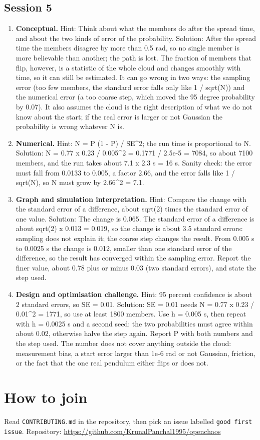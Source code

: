 \documentclass[11pt,a4paper]{article}
\begin{document}
\subsection*{Session 5}
\begin{enumerate}[nosep]
\item \textbf{Conceptual.} Hint: Think about what the members do after the spread time, and about the two kinds of error of the probability. Solution: After the spread time the members disagree by more than 0.5 rad, so no single member is more believable than another; the path is lost. The fraction of members that flip, however, is a statistic of the whole cloud and changes smoothly with time, so it can still be estimated. It can go wrong in two ways: the sampling error (too few members, the standard error falls only like 1 / sqrt(N)) and the numerical error (a too coarse step, which moved the 95 degree probability by 0.07). It also assumes the cloud is the right description of what we do not know about the start; if the real error is larger or not Gaussian the probability is wrong whatever N is.
\item \textbf{Numerical.} Hint: N = P (1 - P) / SE\textasciicircum{}2; the run time is proportional to N. Solution: N = 0.77 x 0.23 / 0.005\textasciicircum{}2 = 0.1771 / 2.5e-5 = 7084, so about 7100 members, and the run takes about 7.1 x 2.3 s = 16 s. Sanity check: the error must fall from 0.0133 to 0.005, a factor 2.66, and the error falls like 1 / sqrt(N), so N must grow by 2.66\textasciicircum{}2 = 7.1.
\item \textbf{Graph and simulation interpretation.} Hint: Compare the change with the standard error of a difference, about sqrt(2) times the standard error of one value. Solution: The change is 0.065. The standard error of a difference is about sqrt(2) x 0.013 = 0.019, so the change is about 3.5 standard errors: sampling does not explain it; the coarse step changes the result. From 0.005 s to 0.0025 s the change is 0.012, smaller than one standard error of the difference, so the result has converged within the sampling error. Report the finer value, about 0.78 plus or minus 0.03 (two standard errors), and state the step used.
\item \textbf{Design and optimisation challenge.} Hint: 95 percent confidence is about 2 standard errors, so SE = 0.01. Solution: SE = 0.01 needs N = 0.77 x 0.23 / 0.01\textasciicircum{}2 = 1771, so use at least 1800 members. Use h = 0.005 s, then repeat with h = 0.0025 s and a second seed: the two probabilities must agree within about 0.02, otherwise halve the step again. Report P with both numbers and the step used. The number does not cover anything outside the cloud: measurement bias, a start error larger than 1e-6 rad or not Gaussian, friction, or the fact that the one real pendulum either flips or does not.
\end{enumerate}

\section{How to join}
Read \texttt{CONTRIBUTING.md} in the repository, then pick an issue labelled \texttt{good first issue}. Repository: \url{https://github.com/KrunalPanchal1995/openchaos}
\end{document}
